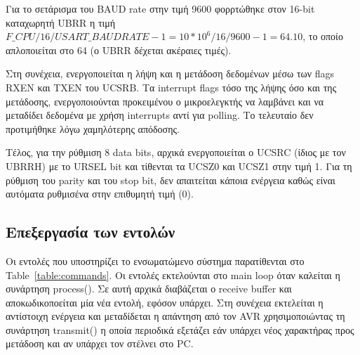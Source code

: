 \documentclass[a4paper,12pt]{article}
\begin{document}
Για το σετάρισμα του BAUD rate στην τιμή 9600 φορρτώθηκε στον 16-bit καταχωρητή UBRR η τιμή $F\_CPU/16/USART\_BAUDRATE - 1  = 10 * 10^6 / 16 / 9600 - 1 = 64.10$, το οποίο απλοποιείται στο 64 (ο UBRR δέχεται ακέραιες τιμές).

Στη συνέχεια, ενεργοποιείται η λήψη και η μετάδοση δεδομένων μέσω των flags RXEN και TXEN του UCSRB. Τα interrupt flags τόσο της λήψης όσο και της μετάδοσης, ενεργοποιούνται προκειμένου ο μικροελεγκτής να λαμβάνει και να μεταδίδει δεδομένα με χρήση interrupts αντί για polling. Το τελευταίο δεν προτιμήθηκε λόγω χαμηλότερης απόδοσης.

Τέλος, για την ρύθμιση 8 data bits, αρχικά ενεργοποιείται ο UCSRC (ίδιος με τον UBRRH) με το URSEL bit και τίθενται τα UCSZ0 και UCSZ1 στην τιμή 1. Για τη ρύθμιση του parity και του stop bit, δεν απαιτείται κάποια ενέργεια καθώς είναι αυτόματα ρυθμισένα στην επιθυμητή τιμή (0).


% 

\subsection{Επεξεργασία των εντολών}
Οι εντολές που υποστηρίζει το ενσωματώμενο σύστημα παρατίθενται στο Table~\ref{table:commands}. Οι εντολές εκτελούνται στο main loop όταν καλείται η συνάρτηση process(). Σε αυτή αρχικά διαβάζεται ο receive buffer και αποκωδικοποείται μία νέα εντολή, εφόσον υπάρχει. Στη συνέχεια εκτελείται η αντίστοιχη ενέργεια και μεταδίδεται η απάντηση από τον AVR χρησιμοποιώντας τη συνάρτηση transmit() η οποία περιοδικά εξετάζει εάν υπάρχει νέος χαρακτήρας προς μετάδοση και αν υπάρχει τον στέλνει στο PC.
\end{document}
